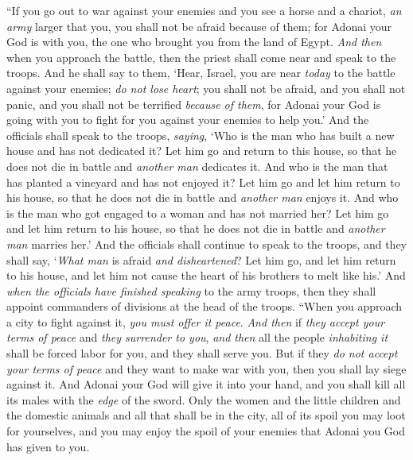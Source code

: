 \begin{biblechapter} %
\verse “If you go out to war against your enemies and you see a horse and a chariot, \textit{an army} larger that you, you shall not be afraid because of them; for Adonai your God is with you, the one who brought you from the land of Egypt.
\verse \textit{And then} when you approach the battle, then the priest shall come near and speak to the troops.
\verse And he shall say to them, ‘Hear, Israel, you are near \textit{today} to the battle against your enemies; \textit{do not lose heart}; you shall not be afraid, and you shall not panic, and you shall not be terrified \textit{because of them},
\verse for Adonai your God is going with you to fight for you against your enemies to help you.’
\verse And the officials shall speak to the troops, \textit{saying}, ‘Who is the man who has built a new house and has not dedicated it? Let him go and return to this house, so that he does not die in battle and \textit{another man} dedicates it.
\verse And who is the man that has planted a vineyard and has not enjoyed it? Let him go and let him return to his house, so that he does not die in battle and \textit{another man} enjoys it.
\verse And who is the man who got engaged to a woman and has not married her? Let him go and let him return to his house, so that he does not die in battle and \textit{another man} marries her.’
\verse And the officials shall continue to speak to the troops, and they shall say, ‘\textit{What man} is afraid \textit{and disheartened}? Let him go, and let him return to his house, and let him not cause the heart of his brothers to melt like his.’
\verse And \textit{when the officials have finished speaking} to the army troops, then they shall appoint commanders of divisions at the head of the troops.
\verse “When you approach a city to fight against it, \textit{you must offer it peace}.
\verse \textit{And then} if \textit{they accept your terms of peace} and \textit{they surrender to you}, \textit{and then} all the people \textit{inhabiting it} shall be forced labor for you, and they shall serve you.
\verse But if they \textit{do not accept your terms of peace} and they want to make war with you, then you shall lay siege against it.
\verse And Adonai your God will give it into your hand, and you shall kill all its males with the \textit{edge} of the sword.
\verse Only the women and the little children and the domestic animals and all that shall be in the city, all of its spoil you may loot for yourselves, and you may enjoy the spoil of your enemies that Adonai you God has given to you.

\end{biblechapter}
